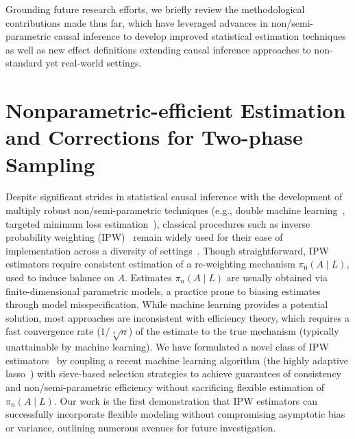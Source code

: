 Grounding future research efforts, we briefly review the methodological
contributions made thus far, which have leveraged advances in
non/semi-parametric causal inference to develop improved statistical estimation
techniques as well as new effect definitions extending causal inference
approaches to non-standard yet real-world settings.

\section{Nonparametric-efficient Estimation and Corrections for Two-phase
  Sampling}

Despite significant strides in statistical causal inference with the development
of multiply robust non/semi-parametric techniques (e.g., double machine
learning~\citep{chernozhukov2017double, chernozhukov2018double}, targeted
minimum loss estimation~\citep{vdl2006targeted, vdl2011targeted,
vdl2018targeted}), classical procedures such as inverse probability weighting
(IPW)~\citep{horvitz1952generalization, rosenbaum1983central, hernan2020causal}
remain widely used for their ease of implementation across a diversity of
settings~\citep{hernan2020causal}. Though straightforward, IPW estimators
require consistent estimation of a re-weighting mechanism $\pi_0(A \mid L)$,
used to induce balance on $A$. Estimates $\pi_n(A \mid L)$ are usually obtained
via finite-dimensional parametric models, a practice prone to biasing estimates
through model misspecification. While machine learning provides a potential
solution, most approaches are inconsistent with efficiency theory, which
requires a fast convergence rate ($1/\sqrt[4]{n}$) of the estimate to the true
mechanism (typically unattainable by machine learning). We have formulated
a novel class of IPW estimators~\citep{ertefaie2020nonparametric} by coupling
a recent machine learning algorithm (the highly adaptive
lasso~\citep{benkeser2016highly, vdl2017generally, bibaut2019fast,
hejazi2020hal9001}) with sieve-based selection strategies to achieve guarantees
of consistency and non/semi-parametric efficiency without sacrificing flexible
estimation of $\pi_n(A \mid L)$. Our work is the first demonstration that IPW
estimators can successfully incorporate flexible modeling without compromising
asymptotic bias or variance, outlining numerous avenues for future
investigation.

